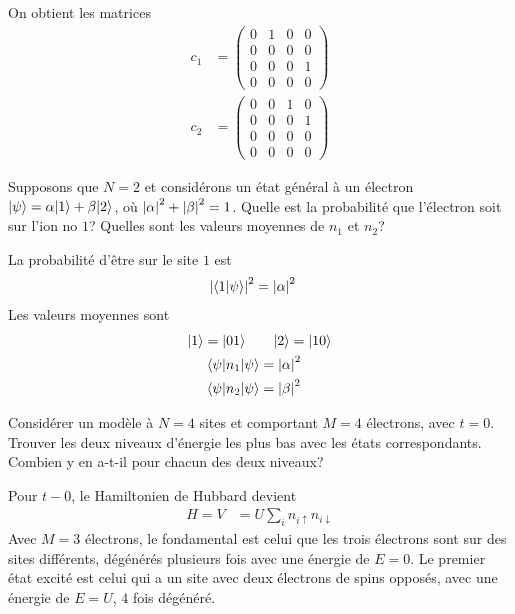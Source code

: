 \documentclass{subfiles}[../main.tex]
\begin{document}
            On obtient les matrices
            \begin{align}
                c_1&=\begin{pmatrix}
                    0&1&0&0\\
                    0&0&0&0\\
                    0&0&0&1\\
                    0&0&0&0
                \end{pmatrix}\\
                c_2&=\begin{pmatrix}
                    0&0&1&0\\
                    0&0&0&1\\
                    0&0&0&0\\
                    0&0&0&0
                \end{pmatrix}
            \end{align}

            \begin{problem}
                Supposons que $N=2$ et
            considérons un état général à un électron
            $|{\psi}\rangle=\alpha|{1}\rangle+\beta|{2}\rangle$,
            où $\abs{\alpha}^2+\abs{\beta}^2=1$. Quelle
            est la probabilité que l'électron soit sur
            l'ion no $1$? Quelles sont les valeurs moyennes
            de $n_1$ et $n_2$?
            \end{problem}
            La probabilité d'être sur le site $1$ est
            \begin{align}
                \abs{\langle{1}|{\psi}\rangle}^2&=\abs{\alpha}^2
            \end{align}
            Les valeurs moyennes sont
            \begin{align}
                |{1}\rangle=|{01}\rangle\quad&\quad|{2}\rangle=|{10}\rangle\\
                \langle{\psi}|n_1|{\psi}\rangle&=\abs{\alpha}^2\\
                \langle{\psi}|n_2|{\psi}\rangle&=\abs{\beta}^2
            \end{align}

            \begin{problem}
                Considérer un modèle
            à $N=4$ sites et comportant $M=4$ électrons,
            avec $t=0$. Trouver les deux niveaux d'énergie
            les plus bas avec les états correspondants.
            Combien y en a-t-il pour chacun des deux
            niveaux?
            \end{problem}
            Pour $t-0$, le Hamiltonien de Hubbard devient
            \begin{align}
                H=V&=U\sum_{i}n_{i\uparrow}n_{i\downarrow}
            \end{align}
            Avec $M=3$ électrons, le fondamental est celui que les trois
            électrons sont sur des sites différents, dégénérés plusieurs fois
            avec une énergie de $E=0$. Le premier état excité est celui qui
            a un site avec deux électrons de spins opposés, avec une énergie de
            $E=U$, $4$ fois dégénéré.
\end{document}
